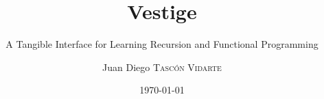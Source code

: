 \documentclass{beamer}
\title{Vestige}
\subtitle{A Tangible Interface for Learning Recursion and Functional Programming}
\author{Juan Diego \textsc{Tascón Vidarte}}
\institute{Konkuk University \\ HCI Lab}
\date{\today{}}
\begin{document}
\begin{frame}
  \titlepage
\end{frame}






\nocite{*}
\end{document}
